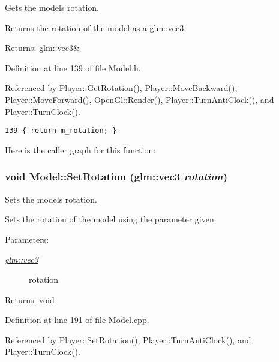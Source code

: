 Gets the models rotation. 

Returns the rotation of the model as a \hyperlink{group__core__types_g1c47e8b3386109bc992b6c48e91b0be7}{glm::vec3}.

\begin{Desc}
\item[Returns:]\hyperlink{group__core__types_g1c47e8b3386109bc992b6c48e91b0be7}{glm::vec3}\& \end{Desc}


Definition at line 139 of file Model.h.

Referenced by Player::GetRotation(), Player::MoveBackward(), Player::MoveForward(), OpenGl::Render(), Player::TurnAntiClock(), and Player::TurnClock().

\begin{Code}\begin{verbatim}139 { return m_rotation; }
\end{verbatim}
\end{Code}




Here is the caller graph for this function:\hypertarget{class_model_71aa61e54f3f12bc86175fa359079d23}{
\subsubsection[SetRotation]{\setlength{\rightskip}{0pt plus 5cm}void Model::SetRotation ({\bf glm::vec3} {\em rotation})}}
\label{class_model_71aa61e54f3f12bc86175fa359079d23}


Sets the models rotation. 

Sets the rotation of the model using the parameter given.

\begin{Desc}
\item[Parameters:]
\begin{description}
\item[{\em \hyperlink{group__core__types_g1c47e8b3386109bc992b6c48e91b0be7}{glm::vec3}}]rotation \end{description}
\end{Desc}
\begin{Desc}
\item[Returns:]void \end{Desc}


Definition at line 191 of file Model.cpp.

Referenced by Player::SetRotation(), Player::TurnAntiClock(), and Player::TurnClock().

